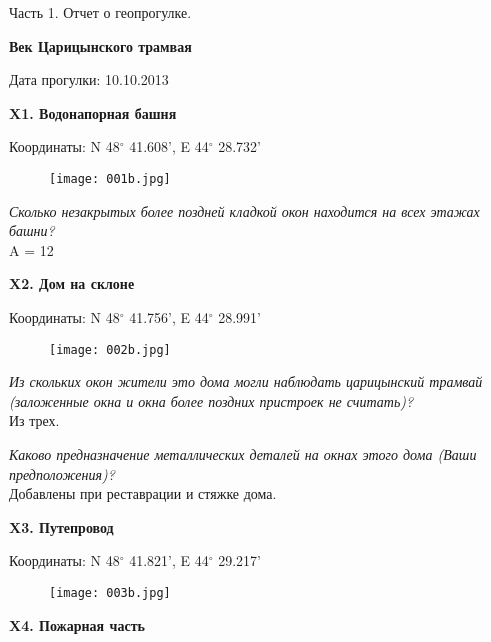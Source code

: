 \documentclass[pscyr]{hedwork}
\begin{document}
  \maketitle
  \begin{center}
    \large Часть 1. Отчет о геопрогулке.

    \bf Век Царицынского трамвая
  \end{center}
  \begin{flushright}
    Дата прогулки: 10.10.2013
  \end{flushright}

  \textbf{X1. Водонапорная башня}

  Координаты: N 48\( ^\circ \) 41.608', E 44\( ^\circ \) 28.732'

  \begin{figure}[htbp]
    \center
    \texttt{[image: 001b.jpg]}
  \end{figure}

  \emph{Сколько незакрытых более поздней кладкой окон находится на всех
  этажах башни?} \\
  A = 12

  \pagebreak

  \textbf{X2. Дом на склоне}

  Координаты: N 48\( ^\circ \) 41.756', E 44\( ^\circ \) 28.991'

  \begin{figure}[htbp]
    \center
    \texttt{[image: 002b.jpg]}
  \end{figure}

  \emph{Из скольких окон жители это дома могли наблюдать царицынский трамвай
  (заложенные окна и окна более поздних пристроек не считать)?} \\
  Из трех.

  \emph{Каково предназначение металлических деталей на окнах этого дома
  (Ваши предположения)?} \\
  Добавлены при реставрации и стяжке дома.

  \pagebreak

  \textbf{X3. Путепровод}

  Координаты: N 48\( ^\circ \) 41.821', E 44\( ^\circ \) 29.217'

  \begin{figure}[htbp]
    \center
    \texttt{[image: 003b.jpg]}
  \end{figure}

  \pagebreak

  \textbf{X4. Пожарная часть}
\end{document}
